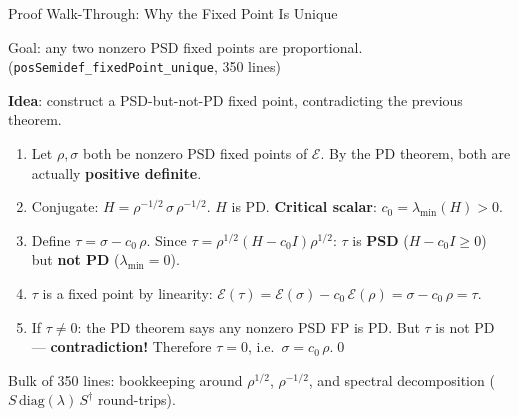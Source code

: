 \documentclass[aspectratio=169,10pt]{beamer}
\begin{document}
\begin{frame}{Proof Walk-Through: Why the Fixed Point Is Unique}
    \vspace{-0.7em}

    {\small\textcolor{dimwhite}{Goal: any two nonzero PSD fixed points are proportional.
    \quad(\texttt{posSemidef\_fixedPoint\_unique}, 350 lines)}}

    \vspace{0.2em}
    \textbf{Idea}: construct a PSD-but-not-PD fixed point, contradicting the
    previous theorem.

    \begin{enumerate}\itemsep0em\small
        \item Let $\rho, \sigma$ both be nonzero PSD fixed points of $\mathcal{E}$.
            By the PD theorem, both are actually \textbf{positive definite}.

        \item Conjugate:
            $H = \rho^{-1/2}\,\sigma\,\rho^{-1/2}$.
            $H$ is PD.
            \textbf{Critical scalar}: $c_0 = \lambda_{\min}(H) > 0$.

        \item Define $\tau = \sigma - c_0\,\rho$.
            Since $\tau = \rho^{1/2}(H - c_0 I)\rho^{1/2}$:
            $\tau$ is \textbf{PSD} ($H - c_0 I \geq 0$) but \textbf{not PD}
            ($\lambda_{\min} = 0$).

        \item $\tau$ is a fixed point by linearity:
            $\mathcal{E}(\tau) = \mathcal{E}(\sigma) - c_0\,\mathcal{E}(\rho) = \sigma - c_0\,\rho = \tau$.

        \item If $\tau \neq 0$: the PD theorem says any nonzero PSD FP is PD.
            But $\tau$ is not PD --- \textbf{contradiction!}
            Therefore $\tau = 0$, i.e.\ $\sigma = c_0\,\rho$.\qed
    \end{enumerate}

    \vspace{0.1em}
    {\scriptsize\textcolor{dimwhite}{Bulk of 350 lines: bookkeeping around
    $\rho^{1/2}$, $\rho^{-1/2}$, and spectral decomposition
    ($S\,\mathrm{diag}(\lambda)\,S^\dagger$ round-trips).}}
\end{frame}
\end{document}
